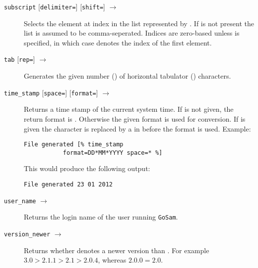 \documentclass[11pt,a4paper]{refrep}
\newcommand{\golem}{{\tt GoSam}\xspace}
\begin{document}
\begin{description}
\item[\texttt{subscript}  
   {[\texttt{delimiter=}]}
   {[\texttt{shift=}]} $\to$ ]
   Selects the element at index  in the list
   represented by . If  is not present
   the list is assumed to be comma-seperated. Indices are zero-based
   unless  is specified, in which case 
   denotes the index of the first element.
\item[\texttt{tab} {[\texttt{rep=}]} $\to$ ]
   Generates the given
   number () of horizontal tabulator (\lit{\\t}) characters.
\item[\texttt{time\_stamp} {[\texttt{space=}]}
   {[\texttt{format=}]} $\to$ ]
   Returns a time stamp of the current system time. If  is
   not given, the return format is . Otherwise the given
   format is used for conversion. If  is given the
   character  is replaced by a \lit{ } in  before
   the format is used. Example:
\begin{lstlisting}
File generated [% time_stamp 
           format=DD*MM*YYYY space=* %]
\end{lstlisting}
   This would produce the following output:
\begin{lstlisting}
File generated 23 01 2012
\end{lstlisting}
\item[\texttt{user\_name} $\to$ ]
   Returns the login name of the user running \golem{}.
\item[\texttt{version\_newer}  
   $\to$ ]
   Returns whether  denotes a newer version than
   . For example $3.0>2.1.1>2.1>2.0.4$, whereas
   $2.0.0=2.0$.
\end{description}
\end{document}
